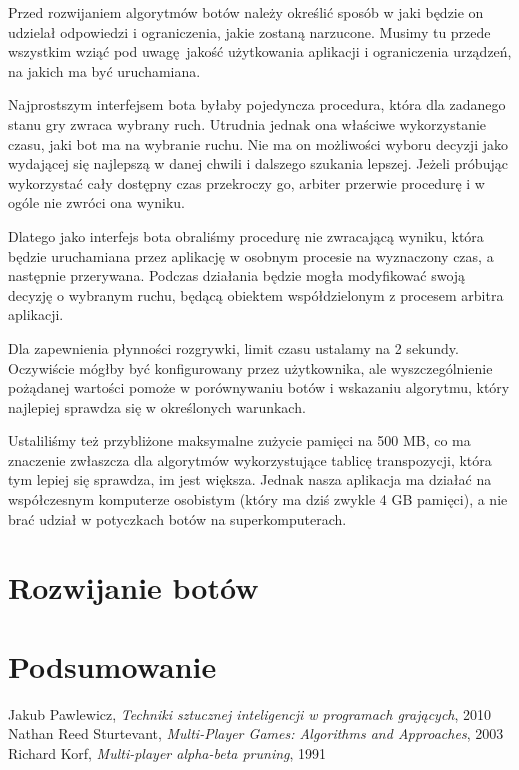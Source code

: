 \documentclass{pracamgr}
\begin{document}
Przed rozwijaniem algorytmów botów należy określić sposób w jaki będzie on udzielał odpowiedzi i ograniczenia, jakie zostaną narzucone.
Musimy tu przede wszystkim wziąć pod uwagę jakość użytkowania aplikacji i ograniczenia urządzeń, na jakich ma być uruchamiana.

Najprostszym interfejsem bota byłaby pojedyncza procedura, która dla zadanego stanu gry zwraca wybrany ruch.
Utrudnia jednak ona właściwe wykorzystanie czasu, jaki bot ma na wybranie ruchu.
Nie ma on możliwości wyboru decyzji jako wydającej się najlepszą w danej chwili i dalszego szukania lepszej.
Jeżeli próbując wykorzystać cały dostępny czas przekroczy go, arbiter przerwie procedurę i w ogóle nie zwróci ona wyniku.

Dlatego jako interfejs bota obraliśmy procedurę nie zwracającą wyniku, która będzie uruchamiana przez aplikację w osobnym procesie na wyznaczony czas, a następnie przerywana.
Podczas działania będzie mogła modyfikować swoją decyzję o wybranym ruchu, będącą obiektem współdzielonym z procesem arbitra aplikacji.

Dla zapewnienia płynności rozgrywki, limit czasu ustalamy na 2 sekundy.
Oczywiście mógłby być konfigurowany przez użytkownika, ale wyszczególnienie pożądanej wartości pomoże w porównywaniu botów i wskazaniu algorytmu, który najlepiej sprawdza się w określonych warunkach.

Ustaliliśmy też przybliżone maksymalne zużycie pamięci na 500 MB, co ma znaczenie zwłaszcza dla algorytmów wykorzystujące tablicę transpozycji, która tym lepiej się sprawdza, im jest większa.
Jednak nasza aplikacja ma działać na współczesnym komputerze osobistym (który ma dziś zwykle 4 GB pamięci), a nie brać udział w potyczkach botów na superkomputerach.

\chapter{Rozwijanie botów}

\chapter{Podsumowanie}

\begin{thebibliography}{99}

 Jakub Pawlewicz, \textit{Techniki sztucznej inteligencji
    w programach grających}, 2010
 Nathan Reed Sturtevant, \textit{Multi-Player Games: Algorithms and Approaches}, 2003
 Richard Korf, \textit{Multi-player alpha-beta pruning}, 1991

\end{thebibliography}
\end{document}
